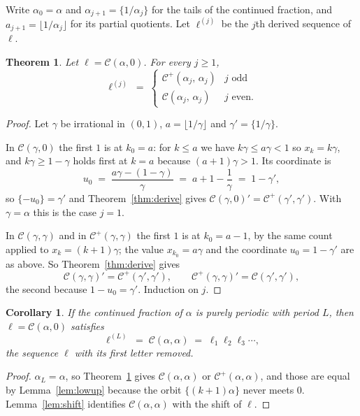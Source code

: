 \documentclass[11pt,a4paper]{article}
\newcommand{\C}{\mathcal{C}}
\newcommand{\Cp}{\mathcal{C}^{+}}
\theoremstyle{definition}
\theoremstyle{plain}
\newtheorem{theorem}[definition]{Theorem}
\newtheorem{corollary}[definition]{Corollary}
\begin{document}
Write $\alpha_0 = \alpha$ and $\alpha_{j+1} = \{1/\alpha_j\}$ for the tails of
the continued fraction, and $a_{j+1} = \lfloor 1/\alpha_j \rfloor$ for its
partial quotients. Let $\ell^{(j)}$ be the $j$th derived sequence of $\ell$.

\begin{theorem}\label{thm:tails}
Let $\ell = \C(\alpha, 0)$. For every $j \geq 1$,
\[
  \ell^{(j)} \;=\;
  \begin{cases}
    \Cp(\alpha_j,\, \alpha_j) & j \text{ odd} \\
    \C(\alpha_j,\, \alpha_j) & j \text{ even.}
  \end{cases}
\]
\end{theorem}

\begin{proof}
Let $\gamma$ be irrational in $(0,1)$, $a = \lfloor 1/\gamma\rfloor$ and
$\gamma' = \{1/\gamma\}$.

In $\C(\gamma,0)$ the first $1$ is at $k_0 = a$: for $k \leq a$ we have
$k\gamma \leq a\gamma < 1$ so $x_k = k\gamma$, and $k\gamma \geq 1-\gamma$ holds
first at $k = a$ because $(a+1)\gamma > 1$. Its coordinate is
\[
  u_0 \;=\; \frac{a\gamma - (1-\gamma)}{\gamma} \;=\; a + 1 - \frac{1}{\gamma}
  \;=\; 1 - \gamma' ,
\]
so $\{-u_0\} = \gamma'$ and Theorem~\ref{thm:derive} gives
$\C(\gamma,0)' = \Cp(\gamma',\gamma')$. With $\gamma = \alpha$ this is the case
$j = 1$.

In $\C(\gamma,\gamma)$ and in $\Cp(\gamma,\gamma)$ the first $1$ is at
$k_0 = a-1$, by the same count applied to $x_k = (k+1)\gamma$; the value
$x_{k_0} = a\gamma$ and the coordinate $u_0 = 1 - \gamma'$ are as above. So
Theorem~\ref{thm:derive} gives
\[
  \C(\gamma,\gamma)' = \Cp(\gamma',\gamma') , \qquad
  \Cp(\gamma,\gamma)' = \C(\gamma',\gamma') ,
\]
the second because $1 - u_0 = \gamma'$. Induction on $j$.
\end{proof}

\begin{corollary}\label{cor:cycle}
If the continued fraction of $\alpha$ is purely periodic with period $L$, then
$\ell = \C(\alpha,0)$ satisfies
\[
  \ell^{(L)} \;=\; \C(\alpha,\alpha) \;=\; \ell_1 \ell_2 \ell_3 \cdots ,
\]
the sequence $\ell$ with its first letter removed.
\end{corollary}

\begin{proof}
$\alpha_L = \alpha$, so Theorem~\ref{thm:tails} gives $\C(\alpha,\alpha)$ or
$\Cp(\alpha,\alpha)$, and those are equal by Lemma~\ref{lem:lowup} because the
orbit $\{(k+1)\alpha\}$ never meets $0$. Lemma~\ref{lem:shift} identifies
$\C(\alpha,\alpha)$ with the shift of $\ell$.
\end{proof}
\end{document}
